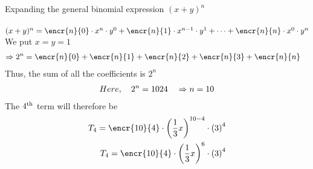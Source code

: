 \begin{solution}
Expanding the general binomial expression $(x+y)^{n}$\\
\\
$(x+y)^{n} = \encr{n}{0}\cdot x^{n} \cdot y^{0} + \encr{n}{1}\cdot x^{n-1} \cdot y^{1} + \cdots  +\encr{n}{n} \cdot x^{0} \cdot y^{n}$ \\
We put $x = y = 1$ \\
\begin{align}
\Rightarrow 2^{n} &= \encr{n}{0} + \encr{n}{1} + \encr{n}{2} + \encr{n}{3}  +\encr{n}{n} 
\end{align}
Thus, the sum of all the coefficients is $2^{n}$ \\
\begin{align}
Here, \quad 2^{n} = 1024 \quad \Rightarrow n = 10
\end{align} 
The $4^{\text{th}}$ term will therefore be 
\begin{align}
{T}_{\vbone} = \encr{\vbsix}{\vbone}\cdot \left(\vbthree x\right)^{\vbsix - \vbone} \cdot \left(\vbfour\right)^{\vbone}  \\
{T}_{\vbone} = \encr{\vbsix}{\vbone}\cdot \left(\vbthree x\right)^{\vbseven} \cdot \left(\vbfour\right)^{\vbone}
\end{align}
\end{solution}


